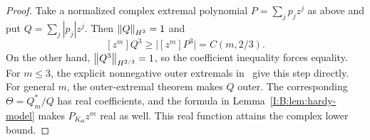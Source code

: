 \begin{proof}
Take a normalized complex extremal polynomial $P=\sum_jp_jz^j$ as above
and put $Q=\sum_j|p_j|z^j$.  Then $\left\lVert Q\right\rVert_{H^2}=1$ and
\[
 [z^m]Q^3\ge\bigl|[z^m]P^3\bigr|=C(m,2/3).
\]
On the other hand, $\left\lVert Q^3\right\rVert_{H^{2/3}}=1$, so the coefficient inequality
forces equality.  For $m\le3$, the explicit nonnegative outer extremals in~\cite{brevig2020} give this step directly. For general $m$, the outer-extremal theorem makes $Q$ outer.
The corresponding $\Theta=Q_m^*/Q$ has real coefficients, and the formula
in Lemma~\ref{I:B:lem:hardy-model} makes $P_{K_\Theta}z^m$ real as well.
This real function attains the complex lower bound.
\end{proof}
